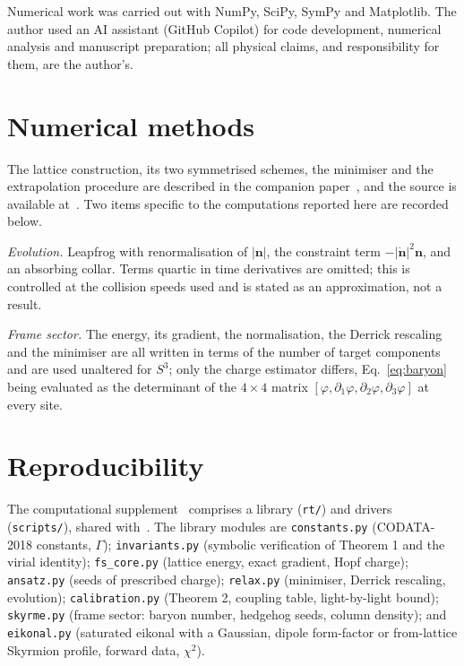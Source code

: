 \documentclass[aps,prd,preprint,nofootinbib,longbibliography]{revtex4-2}
\newcommand{\nv}{\bm{n}}
\begin{document}
\begin{acknowledgments}
Numerical work was carried out with NumPy, SciPy, SymPy and Matplotlib. The
author used an AI assistant (GitHub Copilot) for code development, numerical
analysis and manuscript preparation; all physical claims, and responsibility for
them, are the author's.
\end{acknowledgments}

\appendix

\section{Numerical methods}

The lattice construction, its two symmetrised schemes, the minimiser and the
extrapolation procedure are described in the companion paper~\cite{lattice}, and
the source is available at~\cite{repo}. Two items specific to the computations
reported here are recorded below.

\emph{Evolution.} Leapfrog with renormalisation of $|\nv|$, the constraint term
$-|\dot{\nv}|^2\nv$, and an absorbing collar. Terms quartic in time derivatives
are omitted; this is controlled at the collision speeds used and is stated as an
approximation, not a result.

\emph{Frame sector.} The energy, its gradient, the normalisation, the Derrick
rescaling and the minimiser are all written in terms of the number of target
components and are used unaltered for $S^3$; only the charge estimator differs,
Eq.~\eqref{eq:baryon} being evaluated as the determinant of the
$4\times4$ matrix $[\varphi,\partial_1\varphi,\partial_2\varphi,\partial_3\varphi]$
at every site.

\section{Reproducibility}

The computational supplement~\cite{repo} comprises a library (\texttt{rt/}) and
drivers (\texttt{scripts/}), shared with~\cite{lattice}. The library modules are
\texttt{constants.py}
(CODATA-2018 constants, $\Gamma$); \texttt{invariants.py} (symbolic verification
of Theorem 1 and the virial identity); \texttt{fs\_core.py} (lattice energy,
exact gradient, Hopf charge); \texttt{ansatz.py} (seeds of prescribed charge);
\texttt{relax.py} (minimiser, Derrick rescaling, evolution);
\texttt{calibration.py} (Theorem 2, coupling table, light-by-light bound);
\texttt{skyrme.py} (frame sector: baryon number, hedgehog seeds, column
density); and
\texttt{eikonal.py} (saturated eikonal with a Gaussian, dipole form-factor or
from-lattice Skyrmion profile, forward data, $\chi^2$).
\end{document}
